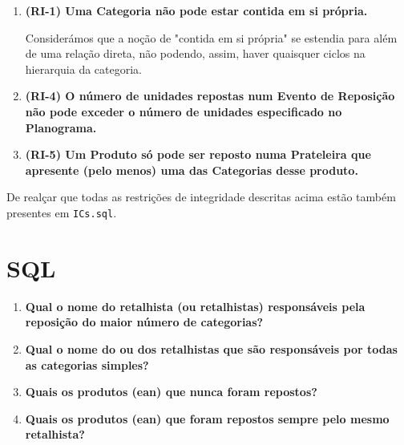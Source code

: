 \documentclass[12pt,a4paper]{article}
\begin{document}
  \begin{enumerate}
    \item \textbf{(RI-1) Uma Categoria não pode estar contida em si própria.}

    Considerámos que a noção de "contida em si própria" se estendia para além de uma
    relação direta, não podendo, assim, haver quaisquer ciclos na hierarquia da categoria.

    

    \item \textbf{(RI-4) O número de unidades repostas num Evento de Reposição
    não pode exceder o número de unidades especificado no Planograma.}

    

    \item \textbf{(RI-5) Um Produto só pode ser reposto numa Prateleira que apresente
    (pelo menos) uma das Categorias desse produto.}

    
  \end{enumerate}

  De realçar que todas as restrições de integridade descritas acima estão também
  presentes em \texttt{ICs.sql}.
  
  \section*{SQL}

  \begin{enumerate}
    \item \textbf{Qual o nome do retalhista (ou retalhistas) responsáveis pela reposição do maior número de categorias?}

    

    \item \textbf{Qual o nome do ou dos retalhistas que são responsáveis por todas as categorias simples?}

    

    \item \textbf{Quais os produtos (ean) que nunca foram repostos?}

    

    \item \textbf{Quais os produtos (ean) que foram repostos sempre pelo mesmo retalhista?}

    
  \end{enumerate}
\end{document}
